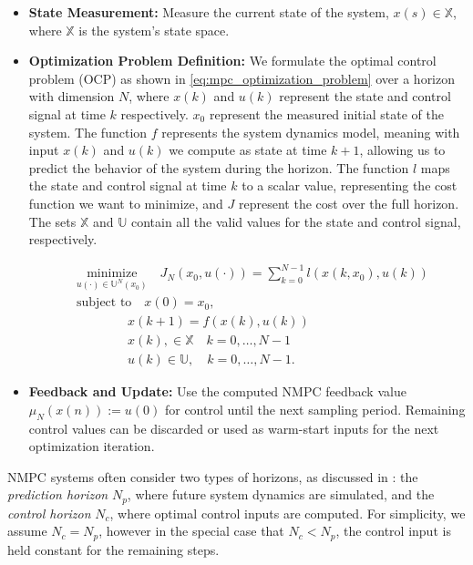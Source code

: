 \begin{itemize}
    \item \textbf{State Measurement:} Measure the current state of the system, \( x(s) \in \mathbb{X} \), where \( \mathbb{X} \) is the system's state space.
    \item \textbf{Optimization Problem Definition:} We formulate the optimal control problem (OCP) as shown in \ref{eq:mpc_optimization_problem} over a horizon with dimension \( N \), where \( x(k) \) and \( u(k) \) represent the state and control signal at time \( k \) respectively. \(x_0\) represent the measured initial state of the system. The function \( f \) represents the system dynamics model, meaning with input \( x(k) \) and \( u(k) \) we compute as state at time \( k + 1 \), allowing us to predict the behavior of the system during the horizon. The function  \( l \) maps the state and control signal at time  \( k \) to a scalar value, representing the cost function we want to minimize, and \( J \) represent the cost over the full horizon. The sets \( \mathbb{X} \) and \( \mathbb{U} \) contain all the valid values for the state and control signal, respectively.
    
    \begin{equation}
        \begin{aligned}
            &\underset{u(\cdot) \in  \mathbb{U}^{N}(x_{0})}{\text{minimize}} \quad J_{N}(x_{0}, u(\cdot)) = \sum_{k=0}^{N-1} l(x(k, x_0), u(k)) \\
            &\text{subject to} \quad x(0) = x_0, \\
            &\quad \quad \quad \quad x(k+1) = f(x(k), u(k)) \\
            &\quad \quad \quad \quad x(k), \in \mathbb{X} \quad k = 0, \dots, N-1\\
            &\quad \quad \quad \quad u(k) \in \mathbb{U}, \quad k = 0, \dots, N-1.
        \end{aligned}
        \label{eq:mpc_optimization_problem}
    \end{equation}
    \item \textbf{Feedback and Update:} Use the computed NMPC feedback value \\ \( \mu_{N}(x(n)) := u(0) \) for control until the next sampling period. Remaining control values can be discarded or used as warm-start inputs for the next optimization iteration.
\end{itemize}

NMPC systems often consider two types of horizons, as discussed in \cite{schwenzer2021review}: the \textit{prediction horizon} \( N_p \), where future system dynamics are simulated, and the \textit{control horizon} \( N_c \), where optimal control inputs are computed. For simplicity, we assume \( N_c = N_p \), however in the special case that \( N_c < N_p \), the control input is held constant for the remaining steps.

